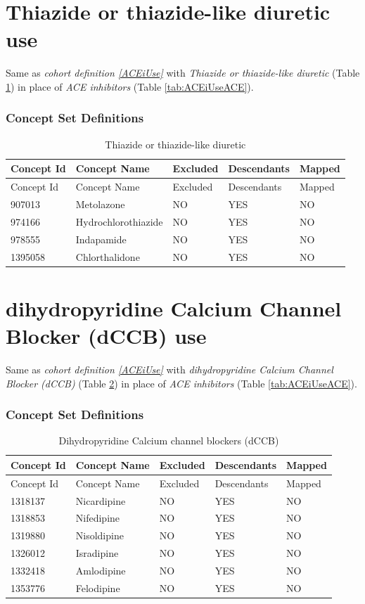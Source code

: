 \documentclass[11pt]{book}
\theoremstyle{definition}
\theoremstyle{definition}
\theoremstyle{definition}
\theoremstyle{remark}
\begin{document}
\hypertarget{THZUse}{%
\section{Thiazide or thiazide-like diuretic use}\label{THZUse}}

Same as \emph{cohort definition \ref{ACEiUse}} with \emph{Thiazide or thiazide-like diuretic} (Table \ref{tab:THZUseTHZ}) in place of \emph{ACE inhibitors} (Table \ref{tab:ACEiUseACE}).

\hypertarget{concept-set-definitions-8}{%
\subsubsection*{Concept Set Definitions}\label{concept-set-definitions-8}}

\begin{longtable}[]{@{}lllll@{}}
\caption{\label{tab:THZUseTHZ} Thiazide or thiazide-like diuretic}\tabularnewline
\toprule
Concept Id & Concept Name & Excluded & Descendants & Mapped\tabularnewline
\midrule
\endfirsthead
\toprule
Concept Id & Concept Name & Excluded & Descendants & Mapped\tabularnewline
\midrule
\endhead
907013 & Metolazone & NO & YES & NO\tabularnewline
974166 & Hydrochlorothiazide & NO & YES & NO\tabularnewline
978555 & Indapamide & NO & YES & NO\tabularnewline
1395058 & Chlorthalidone & NO & YES & NO\tabularnewline
\bottomrule
\end{longtable}

\hypertarget{dCCBUse}{%
\section{dihydropyridine Calcium Channel Blocker (dCCB) use}\label{dCCBUse}}

Same as \emph{cohort definition \ref{ACEiUse}} with \emph{dihydropyridine Calcium Channel Blocker (dCCB)} (Table \ref{tab:dCCBUsedCBB}) in place of \emph{ACE inhibitors} (Table \ref{tab:ACEiUseACE}).

\hypertarget{concept-set-definitions-9}{%
\subsubsection*{Concept Set Definitions}\label{concept-set-definitions-9}}

\begin{longtable}[]{@{}lllll@{}}
\caption{\label{tab:dCCBUsedCBB} Dihydropyridine Calcium channel blockers (dCCB)}\tabularnewline
\toprule
Concept Id & Concept Name & Excluded & Descendants & Mapped\tabularnewline
\midrule
\endfirsthead
\toprule
Concept Id & Concept Name & Excluded & Descendants & Mapped\tabularnewline
\midrule
\endhead
1318137 & Nicardipine & NO & YES & NO\tabularnewline
1318853 & Nifedipine & NO & YES & NO\tabularnewline
1319880 & Nisoldipine & NO & YES & NO\tabularnewline
1326012 & Isradipine & NO & YES & NO\tabularnewline
1332418 & Amlodipine & NO & YES & NO\tabularnewline
1353776 & Felodipine & NO & YES & NO\tabularnewline
\bottomrule
\end{longtable}
\end{document}
